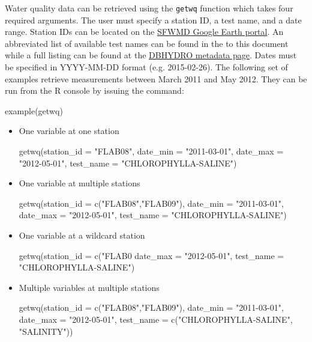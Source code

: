 \documentclass[12pt,notitlepage]{article}
\begin{document}
Water quality data can be retrieved using the \texttt{getwq} function which takes four required arguments. The user must specify a station ID, a test name, and a date range. Station IDs can be located on the \href{http://my.sfwmd.gov/KMLEXT/CUSTOMKMLS/DBHydro/DBHydroKML/DBHYDRO_KML.kmz}{SFWMD Google Earth portal}. An abbreviated list of available test names can be found in the  to this document while a full listing can be found at the \href{http://my.sfwmd.gov/dbhydroplsql/show_dbkey_info.show_data_type_info}{DBHYDRO metadata page}. Dates must be specified in YYYY-MM-DD format (e.g. 2015-02-26).   The following set of examples retrieve measurements between March 2011 and May 2012. They can be run from the R console by issuing the command:

\begin{Schunk}
\begin{Sinput}
 example(getwq)
\end{Sinput}
\end{Schunk}

\begin{itemize}
\item One variable at one station

\begin{Schunk}
\begin{Sinput}
 getwq(station_id = "FLAB08", date_min = "2011-03-01", 
       date_max = "2012-05-01", test_name = "CHLOROPHYLLA-SALINE")
\end{Sinput}
\end{Schunk}

\item One variable at multiple stations

\begin{Schunk}
\begin{Sinput}
 getwq(station_id = c("FLAB08","FLAB09"), date_min = "2011-03-01",
       date_max = "2012-05-01", test_name = "CHLOROPHYLLA-SALINE")
\end{Sinput}
\end{Schunk}

\item One variable at a wildcard station

\begin{Schunk}
\begin{Sinput}
 getwq(station_id = c("FLAB0%
       date_max = "2012-05-01", test_name = "CHLOROPHYLLA-SALINE")
\end{Sinput}
\end{Schunk}

\item Multiple variables at multiple stations

\begin{Schunk}
\begin{Sinput}
 getwq(station_id = c("FLAB08","FLAB09"), date_min = "2011-03-01",
       date_max = "2012-05-01", test_name = c("CHLOROPHYLLA-SALINE",
       "SALINITY"))
\end{Sinput}
\end{Schunk}

\end{itemize}
\end{document}
